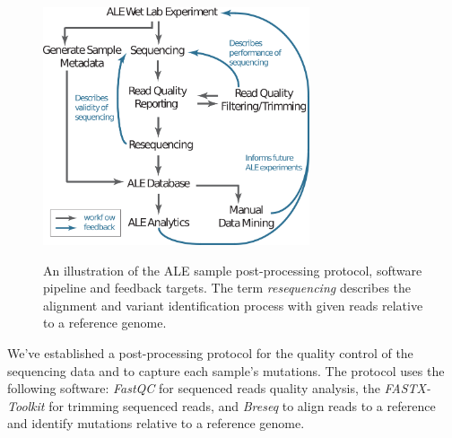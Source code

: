 \documentclass[12pt,final,masters,chapterheads]{ucsd}  %
\begin{document}

\begin{figure}[h!]
  \caption{An illustration of the ALE sample post-processing protocol, software pipeline and feedback targets. The term \textit{resequencing} describes the alignment and variant identification process with given reads relative to a reference genome.}
  \centering
  \includegraphics[width=0.7\textwidth]{post_processing_protocol.png}
  \label{fig:post_processing_protocol}
\end{figure}

We've established a post-processing protocol for the quality control of the sequencing data and to capture each sample's mutations. The protocol uses the following software: \textit{FastQC} \cite{Andrew:2010:Online} for sequenced reads quality analysis, the \textit{FASTX-Toolkit} \cite{FASTX-Toolkit} for trimming sequenced reads, and \textit{Breseq} \cite{breseq_paper} to align reads to a reference and identify mutations relative to a reference genome.
\end{document}
